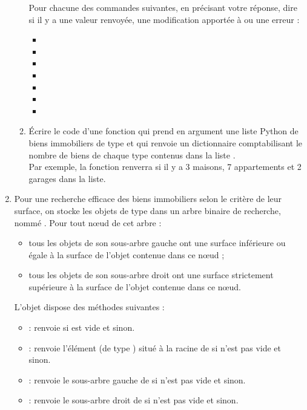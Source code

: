 \documentclass[11pt,a4paper,french,twoside]{PMCours}
\begin{document}
\begin{enumerate}
\begin{enumerate}
Pour chacune des commandes suivantes, en précisant votre réponse, dire si il y a une valeur renvoyée, une modification apportée à  ou une erreur : 
\begin{itemize} 
\item {}
\item {}
\item {}
\item {}
\item {}
\item {}
\item {}
\end{itemize} 
\item Écrire le code d'une fonction  qui prend en argument une liste Python de biens immobiliers de type  et qui renvoie un dictionnaire comptabilisant le nombre de biens de chaque type contenus dans la liste .\\
Par exemple, la fonction renverra  si il y a 3 maisons, 7 appartements et 2 garages dans la liste.
\end{enumerate}    
\item Pour une recherche efficace des biens immobiliers selon le critère de leur surface, on
stocke les objets de type  dans un arbre binaire de recherche, nommé . Pour tout
nœud de cet arbre :
\begin{itemize}
\item tous les objets de son sous-arbre gauche ont une surface inférieure ou égale à la
surface de l'objet contenue dans ce nœud ;
\item tous les objets de son sous-arbre droit ont une surface strictement supérieure à la
surface de l'objet contenue dans ce nœud.
\end{itemize}

L'objet  dispose des méthodes suivantes :
\begin{itemize}
\item[]  : renvoie  si  est vide et  sinon.
\item[]  : renvoie l'élément (de type ) situé à la racine de  si  n'est
pas vide et  sinon.
\item[]  : renvoie le sous-arbre gauche de  si  n'est pas vide et 
sinon.
\item[]  : renvoie le sous-arbre droit de  si  n'est pas vide et  sinon.
\end{itemize}


\end{enumerate}
\end{document}
